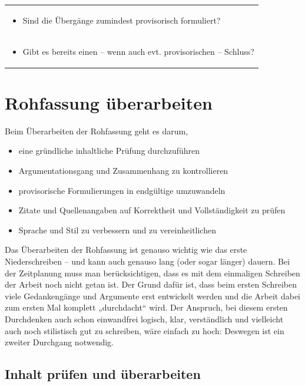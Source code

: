 \documentclass[]{book}
\providecommand{\tightlist}{%
  \setlength{\itemsep}{0pt}\setlength{\parskip}{0pt}}
\theoremstyle{definition}
\theoremstyle{definition}
\theoremstyle{definition}
\theoremstyle{remark}
\begin{document}
\begin{longtable}[]{@{}l@{}}
\begin{minipage}[t]{0.97\columnwidth}
\begin{itemize}
\tightlist
\item
  Sind die Übergänge zumindest provisorisch formuliert? \vspace{-6mm}
\end{itemize}\strut
\end{minipage}\tabularnewline
\begin{minipage}[t]{0.97\columnwidth}\raggedright\strut
\begin{itemize}
\tightlist
\item
  Gibt es bereits einen -- wenn auch evt. provisorischen -- Schluss?
\end{itemize}\strut
\end{minipage}\tabularnewline
\bottomrule
\end{longtable}

\section{Rohfassung überarbeiten}\label{rohfassung-uberarbeiten}

Beim Überarbeiten der Rohfassung geht es darum,

\begin{itemize}
\tightlist
\item
  eine gründliche inhaltliche Prüfung durchzuführen
\item
  Argumentationsgang und Zusammenhang zu kontrollieren
\item
  provisorische Formulierungen in endgültige umzuwandeln
\item
  Zitate und Quellenangaben auf Korrektheit und Vollständigkeit zu
  prüfen
\item
  Sprache und Stil zu verbessern und zu vereinheitlichen
\end{itemize}

Das Überarbeiten der Rohfassung ist genauso wichtig wie das erste
Niederschreiben -- und kann auch genauso lang (oder sogar länger)
dauern. Bei der Zeitplanung muss man berücksichtigen, dass es mit dem
einmaligen Schreiben der Arbeit noch nicht getan ist. Der Grund dafür
ist, dass beim ersten Schreiben viele Gedankengänge und Argumente erst
entwickelt werden und die Arbeit dabei zum ersten Mal komplett
„durchdacht`` wird. Der Anspruch, bei diesem ersten Durchdenken auch
schon einwandfrei logisch, klar, verständlich und vielleicht auch noch
stilistisch gut zu schreiben, wäre einfach zu hoch: Deswegen ist ein
zweiter Durchgang notwendig.

\subsection{Inhalt prüfen und
überarbeiten}\label{inhalt-prufen-und-uberarbeiten}
\end{document}
